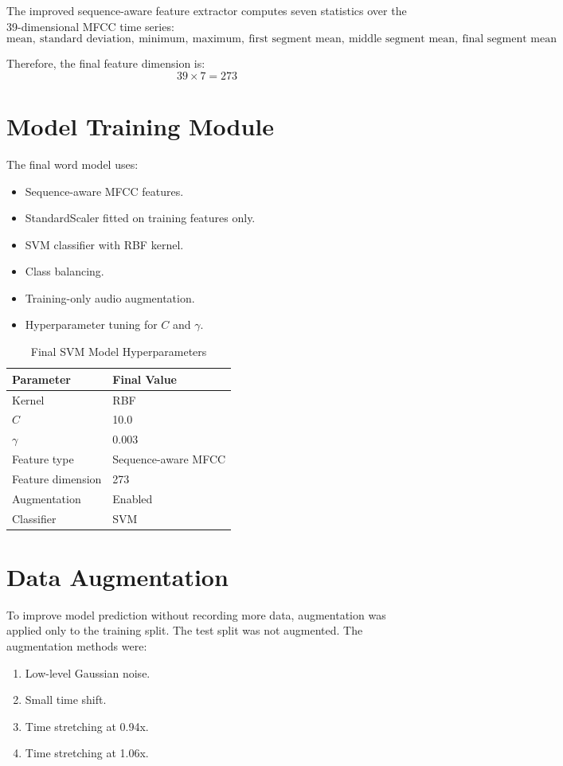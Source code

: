\documentclass[12pt,a4paper]{report}
\begin{document}
The improved sequence-aware feature extractor computes seven statistics over the 39-dimensional MFCC time series:
\[
\text{mean},\ \text{standard deviation},\ \text{minimum},\ \text{maximum},\ \text{first segment mean},\ \text{middle segment mean},\ \text{final segment mean}
\]

Therefore, the final feature dimension is:
\[
39 \times 7 = 273
\]

\section{Model Training Module}
The final word model uses:
\begin{itemize}
    \item Sequence-aware MFCC features.
    \item StandardScaler fitted on training features only.
    \item SVM classifier with RBF kernel.
    \item Class balancing.
    \item Training-only audio augmentation.
    \item Hyperparameter tuning for \(C\) and \(\gamma\).
\end{itemize}

\begin{table}[H]
\centering
\caption{Final SVM Model Hyperparameters}
\begin{tabular}{ll}
\toprule
\textbf{Parameter} & \textbf{Final Value}\\
\midrule
Kernel & RBF\\
\(C\) & 10.0\\
\(\gamma\) & 0.003\\
Feature type & Sequence-aware MFCC\\
Feature dimension & 273\\
Augmentation & Enabled\\
Classifier & SVM\\
\bottomrule
\end{tabular}
\end{table}

\section{Data Augmentation}
To improve model prediction without recording more data, augmentation was applied only to the training split. The test split was not augmented. The augmentation methods were:
\begin{enumerate}
    \item Low-level Gaussian noise.
    \item Small time shift.
    \item Time stretching at 0.94x.
    \item Time stretching at 1.06x.
\end{enumerate}
\end{document}
